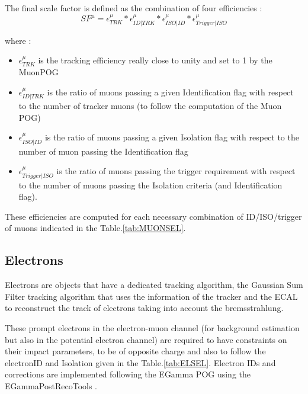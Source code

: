 \documentclass{cernatlasnote}
\begin{document}
The final scale factor is defined as the combination of four efficiencies :
\begin{equation}
    SF^{\mu} = \epsilon^{\mu}_{TRK} *\epsilon^{\mu}_{ID|TRK} * \epsilon^{\mu}_{ISO|ID} * \epsilon^{\mu}_{Trigger|ISO}
\end{equation}

where :
\begin{itemize}
    \item $\epsilon^{\mu}_{TRK}$ is the tracking efficiency really close to unity and set to 1 by the MuonPOG
    \item $\epsilon^{\mu}_{ID|TRK}$ is the ratio of muons passing a given Identification flag with respect to the number of tracker muons (to follow the computation of the Muon POG)
    \item $\epsilon^{\mu}_{ISO|ID}$ is the ratio of muons passing a given Isolation flag with respect to the number of muon passing the Identification flag
    \item $\epsilon^{\mu}_{Trigger|ISO}$ is the ratio of muons passing the trigger requirement with respect to the number of muons passing the Isolation criteria (and Identification flag).
\end{itemize}
These efficiencies are computed for each necessary combination \cite{MuonSpark3} of ID/ISO/trigger of muons  indicated in the Table.\ref{tab:MUONSEL}.

\subsection{Electrons}

Electrons are objects that have a dedicated tracking algorithm, the Gaussian Sum Filter tracking \cite{Adam_2005} algorithm that uses the information of the tracker and the ECAL to reconstruct the track of electrons taking into account the bremsstrahlung.

These prompt electrons in the electron-muon channel (for background estimation but also in the potential electron channel) are required to have constraints on their impact parameters, to be of opposite charge and also to follow the electronID and Isolation given in the Table.\ref{tab:ELSEL}. Electron IDs and corrections are implemented following the EGamma POG using the EGammaPostRecoTools \cite{EgammaPostRecoTools}.
\end{document}
